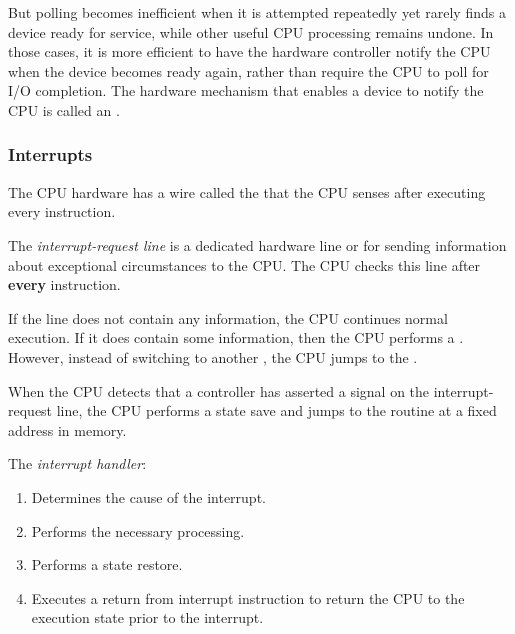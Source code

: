 But polling becomes inefficient when it is attempted repeatedly yet rarely finds a device ready for service, while other useful CPU processing remains undone.
In those cases, it is more efficient to have the hardware controller notify the CPU when the device becomes ready again, rather than require the CPU to poll for I/O completion.
The hardware mechanism that enables a device to notify the CPU is called an .

\subsubsection{Interrupts}\label{subsubsec:Interrupts}
The CPU hardware has a wire called the  that the CPU senses after executing every instruction.

\begin{definition}\label{def:Interrupt_Request_Line}
  The \emph{interrupt-request line} is a dedicated hardware line or  for sending information about exceptional circumstances to the CPU.\@
  The CPU checks this line after \textbf{every} instruction.

  If the line does not contain any information, the CPU continues normal execution.
  If it does contain some information, then the CPU performs a .
  However, instead of switching to another , the CPU jumps to the .
\end{definition}

When the CPU detects that a controller has asserted a signal on the interrupt-request line, the CPU performs a state save and jumps to the  routine at a fixed address in memory.

\begin{definition}\label{def:Interrupt_Handler}
  The \emph{interrupt handler}:
  \begin{enumerate}[noitemsep]
  \item Determines the cause of the interrupt.
  \item Performs the necessary processing.
  \item Performs a state restore.
  \item Executes a return from interrupt instruction to return the CPU to the execution state prior to the interrupt.
  \end{enumerate}
\end{definition}

